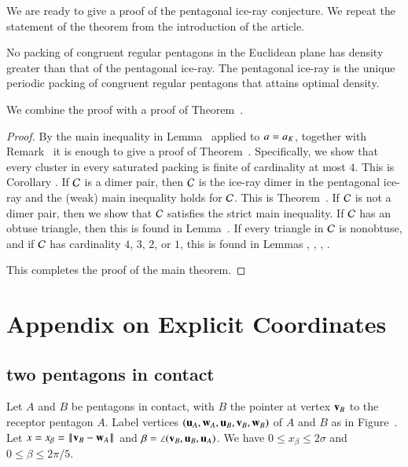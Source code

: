 We are ready to give a proof of the pentagonal ice-ray conjecture. We repeat the statement
of the theorem from the introduction of the article.  

\begin{theorem}   No packing of congruent regular pentagons in the Euclidean
plane has density greater than that of
the pentagonal ice-ray.   The pentagonal ice-ray  is the
unique periodic packing of congruent regular pentagons that attains optimal density.
\end{theorem}

We combine the proof with a proof of Theorem~.

\begin{proof}
By the main inequality in Lemma~ applied to $a=a_K$, together with Remark~
it is enough to give a proof of Theorem~.  Specifically, we show that
every cluster in every saturated packing is finite of cardinality at most $4$.  
This is Corollary .
If $\mathcal C$ is a dimer pair, then $\mathcal C$ is the ice-ray dimer in the pentagonal ice-ray and the (weak)
main inequality holds for $\mathcal C$.  This is Theorem~.  If $\mathcal C$ is not a dimer pair, then
we show that $\mathcal C$ satisfies the strict main inequality.  If $\mathcal C$ has an obtuse triangle, then this
is found in Lemma~.  If every triangle in $\mathcal C$ is nonobtuse, and if $\mathcal C$ has cardinality $4$, $3$,  $2$, or $1$,
this is found in Lemmas , , , .

This completes the proof of the main theorem.
\end{proof}



\section{Appendix on Explicit Coordinates}


\subsection{two pentagons in contact}

Let $A$ and $B$ be pentagons in contact, with $B$ the pointer at
vertex ${\mathbf v}_B$ to the receptor pentagon $A$.  Label vertices
$({\mathbf u}_A,{\mathbf w}_A,{\mathbf u}_B,{\mathbf v}_B,{\mathbf w}_B)$ of $A$ and $B$ as in
Figure~.  Let $x=x_\beta=\norm{\v_B}{\w_A}$ and $\beta =
\angle({\mathbf v}_B,{\mathbf u}_B,{\mathbf u}_A)$.  We have $0\le x_\beta\le 2\sigma$ and $0\le
\beta\le 2\pi/5$.

